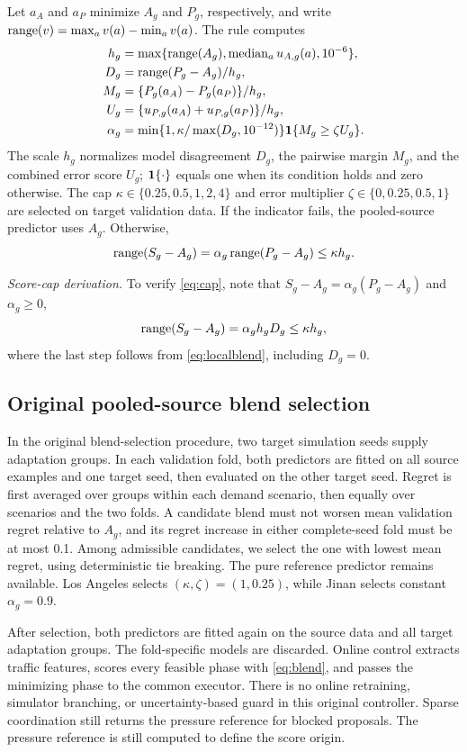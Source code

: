 Let $a_A$ and $a_P$ minimize $A_g$ and $P_g$, respectively, and write $\operatorname{range}(v)=\max_av(a)-\min_av(a)$. The rule computes
\begin{align}
 h_g&=\max\{\operatorname{range}(A_g),\operatorname{median}_a u_{A,g}(a),10^{-6}\},\nonumber\\
 D_g&=\operatorname{range}(P_g-A_g)/h_g,\nonumber\\
 M_g&=\{P_g(a_A)-P_g(a_P)\}/h_g,\nonumber\\
 U_g&=\{u_{P,g}(a_A)+u_{P,g}(a_P)\}/h_g,\nonumber\\
 \alpha_g&=\min\{1,\kappa/\max(D_g,10^{-12})\}
 \mathbf{1}\{M_g\geq\zeta U_g\}.
 \label{eq:localblend}
\end{align}
The scale $h_g$ normalizes model disagreement $D_g$, the pairwise margin $M_g$, and the combined error score $U_g$; $\mathbf{1}\{\cdot\}$ equals one when its condition holds and zero otherwise. The cap $\kappa\in\{0.25,0.5,1,2,4\}$ and error multiplier $\zeta\in\{0,0.25,0.5,1\}$ are selected on target validation data. If the indicator fails, the pooled-source predictor uses $A_g$. Otherwise,
\begin{equation}
 \operatorname{range}(S_g-A_g)=\alpha_g\operatorname{range}(P_g-A_g)\leq\kappa h_g.
 \label{eq:cap}
\end{equation}

\emph{Score-cap derivation.}
To verify \eqref{eq:cap}, note that $S_g-A_g=\alpha_g(P_g-A_g)$ and $\alpha_g\geq0$,
\begin{equation*}
 \operatorname{range}(S_g-A_g)=\alpha_g h_gD_g\leq\kappa h_g,
\end{equation*}
where the last step follows from \eqref{eq:localblend}, including $D_g=0$.

\subsection{Original pooled-source blend selection}
In the original blend-selection procedure, two target simulation seeds supply adaptation groups. In each validation fold, both predictors are fitted on all source examples and one target seed, then evaluated on the other target seed. Regret is first averaged over groups within each demand scenario, then equally over scenarios and the two folds. A candidate blend must not worsen mean validation regret relative to $A_g$, and its regret increase in either complete-seed fold must be at most 0.1. Among admissible candidates, we select the one with lowest mean regret, using deterministic tie breaking. The pure reference predictor remains available. Los Angeles selects $(\kappa,\zeta)=(1,0.25)$, while Jinan selects constant $\alpha_g=0.9$.

After selection, both predictors are fitted again on the source data and all target adaptation groups. The fold-specific models are discarded. Online control extracts traffic features, scores every feasible phase with \eqref{eq:blend}, and passes the minimizing phase to the common executor. There is no online retraining, simulator branching, or uncertainty-based guard in this original controller. Sparse coordination still returns the pressure reference for blocked proposals. The pressure reference is still computed to define the score origin.

